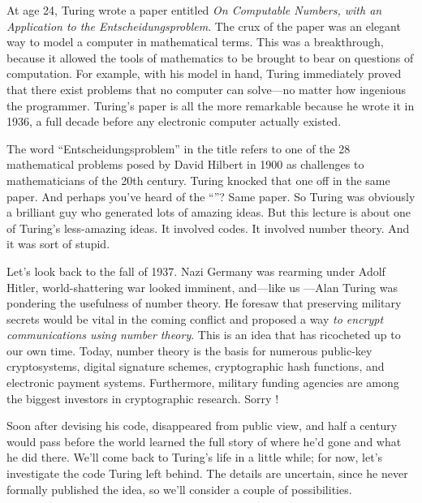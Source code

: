 At age 24, Turing wrote a paper entitled \emph{On Computable Numbers,
  with an Application to the Entscheidungsproblem}.  The crux of the
paper was an elegant way to model a computer in mathematical terms.
This was a breakthrough, because it allowed the tools of mathematics
to be brought to bear on questions of computation.  For example, with
his model in hand, Turing immediately proved that there exist problems
that no computer can solve---no matter how ingenious the programmer.
Turing's paper is all the more remarkable because he wrote it in 1936,
a full decade before any electronic computer actually existed.

The word ``Entscheidungsproblem'' in the title refers to one of the 28
mathematical problems posed by David Hilbert in 1900 as challenges to
mathematicians of the 20th century.  Turing knocked that one off in
the same paper.  And perhaps you've heard of the ``''?  Same paper.  So Turing was obviously a brilliant guy who
generated lots of amazing ideas.  But this lecture is about one of
Turing's less-amazing ideas.  It involved codes.  It involved number
theory.  And it was sort of stupid.


Let's look back to the fall of 1937.  Nazi Germany was rearming under
Adolf Hitler, world-shattering war looked imminent, and---like us
---Alan Turing was pondering the usefulness of number theory.  He
foresaw that preserving military secrets would be vital in the coming
conflict and proposed a way \emph{to encrypt communications using
  number theory}.  This is an idea that has ricocheted up to our own
time.  Today, number theory is the basis for numerous public-key
cryptosystems, digital signature schemes, cryptographic hash
functions, and electronic payment systems.  Furthermore, military
funding agencies are among the biggest investors in cryptographic
research.  Sorry !

Soon after devising his code,  disappeared from public
view, and half a century would pass before the world learned the full
story of where he'd gone and what he did there.  We'll come back to
Turing's life in a little while; for now, let's investigate the code
Turing left behind.  The details are uncertain, since he never
formally published the idea, so we'll consider a couple of
possibilities.

